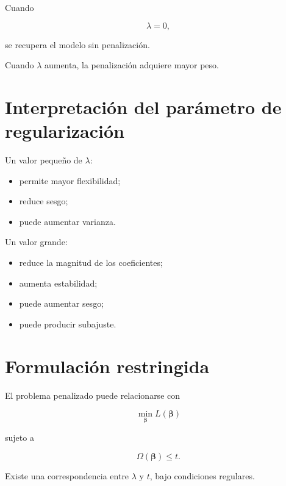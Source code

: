 \documentclass[
  spanish,
  10.5pt,
  letterpaper,
  DIV=11,
  numbers=noendperiod,
  oneside,
  open=any]{scrreprt}
\providecommand{\tightlist}{%
  \setlength{\itemsep}{0pt}\setlength{\parskip}{0pt}}
\theoremstyle{definition}
\theoremstyle{definition}
\theoremstyle{plain}
\theoremstyle{remark}
\begin{document}
Cuando

\[
\lambda=0,
\]

se recupera el modelo sin penalización.

Cuando \(\lambda\) aumenta, la penalización adquiere mayor peso.

\section*{Interpretación del parámetro de
regularización}\label{interpretaciuxf3n-del-paruxe1metro-de-regularizaciuxf3n}


Un valor pequeño de \(\lambda\):

\begin{itemize}
\tightlist
\item
  permite mayor flexibilidad;
\item
  reduce sesgo;
\item
  puede aumentar varianza.
\end{itemize}

Un valor grande:

\begin{itemize}
\tightlist
\item
  reduce la magnitud de los coeficientes;
\item
  aumenta estabilidad;
\item
  puede aumentar sesgo;
\item
  puede producir subajuste.
\end{itemize}

\section*{Formulación restringida}\label{formulaciuxf3n-restringida}


El problema penalizado puede relacionarse con

\[
\min_{\boldsymbol{\beta}}
L(\boldsymbol{\beta})
\]

sujeto a

\[
\Omega(\boldsymbol{\beta})
\leq t.
\]

Existe una correspondencia entre \(\lambda\) y \(t\), bajo condiciones
regulares.
\end{document}
